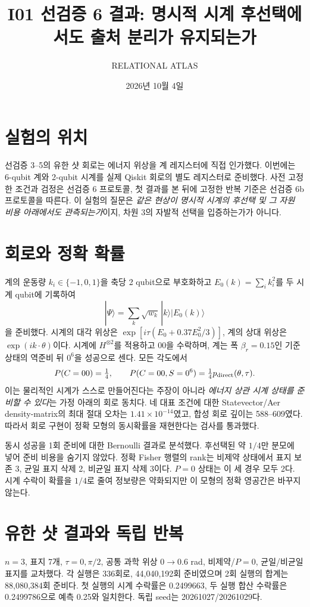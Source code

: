 \documentclass[11pt,a4paper]{article}
\title{I01 선검증 6 결과: 명시적 시계 후선택에서도 출처 분리가 유지되는가}
\author{RELATIONAL ATLAS}
\date{2026년 10월 4일}
\begin{document}
\maketitle

\section{실험의 위치}
선검증 3--5의 유한 샷 회로는 에너지 위상을 계 레지스터에
직접 인가했다. 이번에는 6-qubit 계와 2-qubit 시계를 실제
Qiskit 회로의 별도 레지스터로 준비했다. 사전 고정한 조건과
검정은 선검증 6 프로토콜, 첫 결과를 본 뒤에 고정한 반복
기준은 선검증 6b 프로토콜을 따른다. 이 실험의 질문은
\emph{같은 현상이 명시적 시계의 후선택 및 그 자원 비용 아래에서도
관측되는가}이지, 차원 3의 자발적 선택을 입증하는가가 아니다.

\section{회로와 정확 확률}
계의 운동량 $k_i\in\{-1,0,1\}$을 축당 2 qubit으로 부호화하고
$E_0(k)=\sum_i k_i^2$를 두 시계 qubit에 기록하여
\begin{equation}
  |\Psi\rangle=\sum_k\sqrt{w_k}\,|k\rangle|E_0(k)\rangle
\end{equation}
을 준비했다. 시계의 대각 위상은
$\exp[i\tau(E_0+0.37E_0^2/3)]$, 계의 상대 위상은
$\exp(i k\cdot\theta)$이다. 시계에 $H^{\otimes2}$를 적용하고
$00$을 수락하며, 계는 폭 $\beta_r=0.15$인 기준 상태의
역준비 뒤 $0^6$을 성공으로 센다. 모든 각도에서
\begin{equation}
  P(C=00)=\tfrac14,\qquad
  P(C=00,S=0^6)=\tfrac14 p_{\rm direct}(\theta,\tau).
\end{equation}
이는 물리적인 시계가 스스로 만들어진다는 주장이 아니라
\emph{에너지 상관 시계 상태를 준비할 수 있다}는 가정 아래의
회로 동치다. 네 대표 조건에 대한 Statevector/Aer density-matrix의
최대 절대 오차는 $1.41\times10^{-14}$였고, 합성 회로 깊이는
588--609였다. 따라서 회로 구현이 정확 모형의 동시확률을
재현한다는 검사를 통과했다.

동시 성공을 1회 준비에 대한 Bernoulli 결과로 분석했다.
후선택된 약 $1/4$만 분모에 넣어 준비 비용을 숨기지 않았다.
정확 Fisher 행렬의 rank는 비제약 상태에서 표지 보존 3,
균일 표지 삭제 2, 비균일 표지 삭제 3이다.
$P=0$ 상태는 이 세 경우 모두 2다. 시계 수락이 확률을
$1/4$로 줄여 정보량은 약화되지만 이 모형의 정확 영공간은
바꾸지 않는다.

\section{유한 샷 결과와 독립 반복}
$n=3$, 표지 7개, $\tau=0,\pi/2$, 공통 과학 위상
$0\to0.6$ rad, 비제약/$P=0$, 균일/비균일 표지를 교차했다.
각 실행은 336회로, 44,040,192회 준비였으며 2회 실행의
합계는 88,080,384회 준비다. 첫 실행의 시계 수락률은
0.2499663, 두 실행 합산 수락률은 0.2499786으로 예측
0.25와 일치한다. 독립 seed는 20261027/20261029다.
\end{document}
